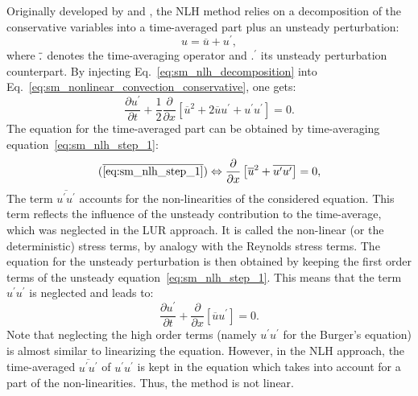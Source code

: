 
Originally developed by \citet{He1998} and \citet{Ning1998},
the NLH method
relies on a decomposition of the conservative variables into a
time-averaged part plus an unsteady perturbation:
\begin{equation}
	u = \overline{u} + u^\prime,
	\label{eq:sm_nlh_decomposition}
\end{equation}
where $\overline{\vphantom{u}.}$ denotes the time-averaging operator and
$.^\prime$ its unsteady perturbation counterpart.
By injecting Eq.~\eqref{eq:sm_nlh_decomposition} into
Eq.~\eqref{eq:sm_nonlinear_convection_conservative}, one gets:
\begin{equation}
	\frac{\partial u^\prime}{\partial t} + 
	\frac{1}{2}\frac{\partial}{\partial x} \left[
	\overline{u}^2 + 2 \overline{u} u^\prime + u^\prime u^\prime \right] = 
	0.
	\label{eq:sm_nlh_step_1}
\end{equation}
The equation for the time-averaged part can be obtained by time-averaging
equation~\eqref{eq:sm_nlh_step_1}:
\begin{equation}
	(\overline{\ref{eq:sm_nlh_step_1}})
	\Leftrightarrow
	\frac{\partial}{\partial x}
	\left[\overline{u}^2 + 
	\overline{u^\prime u^\prime}\right] =
	0,
	\label{eq:sm_nlh_step_2}
\end{equation}
The term $\overline{u^\prime u^\prime}$
accounts for the non-linearities of the considered equation. 
This term reflects the influence of the unsteady contribution to
the time-average, which was neglected in the LUR approach. It
is called the non-linear 
(or the deterministic) stress terms, by analogy with
the Reynolds stress terms. 
The equation for the unsteady perturbation is then obtained by keeping
the first order terms of the unsteady equation~\eqref{eq:sm_nlh_step_1}.
This means that the term $u^\prime u^\prime$ is neglected and leads
to:
\begin{equation}
	\frac{\partial u^\prime}{\partial t} + 
	\frac{\partial}{\partial x} \left[\overline{u} u^\prime \right] = 
	0.
\end{equation}
Note that neglecting the high order terms 
(namely $u^\prime u^\prime$ for the Burger's equation) 
is almost similar to
linearizing the equation. However, in the NLH approach,
the time-averaged $\overline{u^\prime u^\prime}$ 
of $u^\prime u^\prime$ is kept in the
equation which takes into account for a part of the
non-linearities. Thus, the method is not linear.

